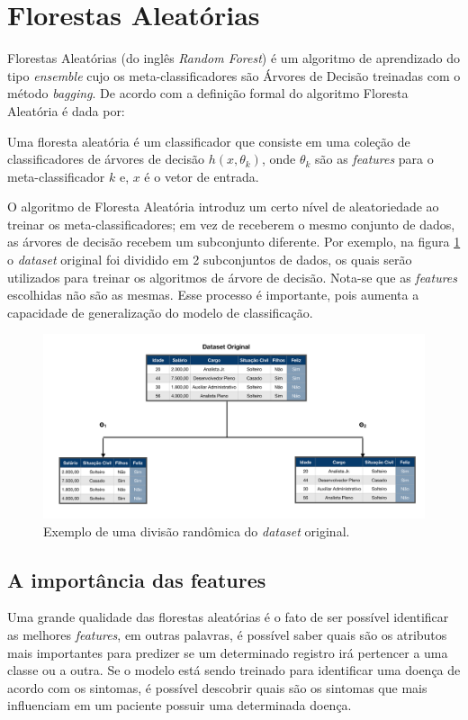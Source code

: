 \section{Florestas Aleatórias}

Florestas Aleatórias (do inglês \textit{Random Forest}) é um algoritmo de aprendizado do tipo \textit{ensemble} cujo os meta-classificadores são Árvores de Decisão \cite{Quinlan:1986} treinadas com o método \textit{bagging}.
De acordo com \cite{breiman:2001} a definição formal do algoritmo Floresta Aleatória é dada por:

\begin{definition}\label{def:floresta}
Uma floresta aleatória é um classificador que consiste em uma coleção de classificadores de árvores de decisão ${h(x, \theta _k)}$, onde ${\theta _k}$ são as \textit{features} para o meta-classificador $k$ e, $x$ é o vetor de entrada.
\end{definition}

O algoritmo de Floresta Aleatória introduz um certo nível de aleatoriedade ao treinar os meta-classificadores; em vez de receberem o mesmo conjunto de dados, as árvores de decisão recebem um subconjunto diferente. Por exemplo, na figura \ref{fig:split_floresta} o \textit{dataset} original foi dividido em 2 subconjuntos de dados, os quais serão utilizados para treinar os algoritmos de árvore de decisão. Nota-se que as \textit{features} escolhidas não são as mesmas. Esse processo é importante, pois aumenta a capacidade de generalização do modelo de classificação.

\begin{figure}[h!]
    \centering
    \includegraphics[scale=0.4]{Imagens/split_RandomForest.png}
    \caption{Exemplo de uma divisão randômica do \textit{dataset} original.}
    \label{fig:split_floresta}
\end{figure}

\subsection{A importância das features}
\label{sec:importancia_features}
Uma grande qualidade das florestas aleatórias é o fato de ser possível identificar as melhores \textit{features}, em outras palavras, é possível saber quais são os atributos mais importantes para predizer se um determinado registro irá pertencer a uma classe ou a outra. Se o modelo está sendo treinado para identificar uma doença de acordo com os sintomas, é possível descobrir quais são os sintomas que mais influenciam em um paciente possuir uma determinada doença.


